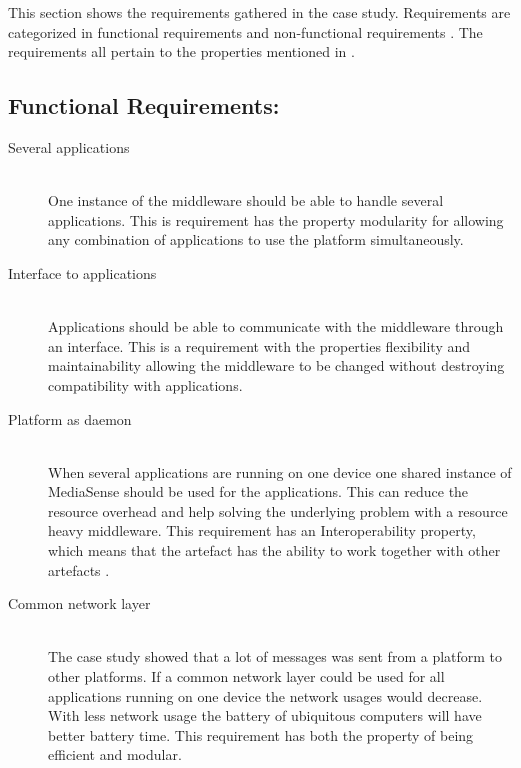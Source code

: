 
This section shows the requirements gathered in the case study. Requirements are categorized in functional requirements and non-functional requirements \cite{Roman1985}. The requirements all pertain to the properties mentioned in \cite{johannesson2012design}. 

\subsection{Functional Requirements:}
\begin{description}
	\item[Several applications] \hfill \\
	One instance of the middleware should be able to handle several applications.
	This is requirement has the property modularity for allowing any combination of applications to use the platform simultaneously.
		
	
	\item[Interface to applications] \hfill \\
	Applications should be able to communicate with the middleware through an interface.
	This is a requirement with the properties flexibility and maintainability allowing the middleware to be changed without destroying compatibility with applications.
	
	\item[Platform as daemon] \hfill \\
	When several applications are running on one device one shared instance of MediaSense should be used for the applications. This can reduce the resource overhead and help solving the underlying problem with a resource heavy middleware. This requirement has an Interoperability property, which means that the artefact has the ability to work together with other artefacts \cite{johannesson2012design}. 
	
	\item[Common network layer] \hfill \\
	The case study showed that a lot of messages was sent from a platform to other platforms. If a common network layer could be used for all applications running on one device the network usages would decrease. With less network usage the battery of ubiquitous computers will have better battery time. This requirement has both the property of being efficient and modular. 
	

\end{description}
